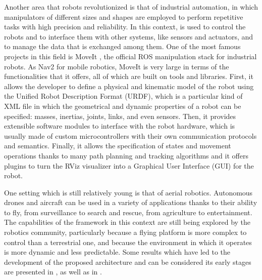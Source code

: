 Another area that robots revolutionized is that of industrial automation, in which manipulators of different sizes and shapes are employed to perform repetitive tasks with high precision and reliability. In this context, \ROS is used to control the robots and to interface them with other systems, like sensors and actuators, and to manage the data that is exchanged among them. One of the most famous projects in this field is MoveIt \cite{picknik_robotics_moveit_nodate,gorner_moveit_2019,coleman_reducing_2014,bonci_robot_2023}, the official ROS manipulation stack for industrial robots. As Nav2 for mobile robotics, MoveIt is very large in terms of the functionalities that it offers, all of which are built on \ROS tools and libraries. First, it allows the developer to define a physical and kinematic model of the robot using the Unified Robot Description Format (URDF), which is a particular kind of XML file in which the geometrical and dynamic properties of a robot can be specified: masses, inertias, joints, links, and even sensors. Then, it provides extensible software modules to interface with the robot hardware, which is usually made of custom microcontrollers with their own communication protocols and semantics. Finally, it allows the specification of states and movement operations thanks to many path planning and tracking algorithms and it offers plugins to turn the RViz visualizer into a Graphical User Interface (GUI) for the robot.

One setting which is still relatively young is that of aerial robotics. Autonomous drones and aircraft can be used in a variety of applications thanks to their ability to fly, from surveillance to search and rescue, from agriculture to entertainment. The capabilities of the \ROS framework in this context are still being explored by the robotics community, particularly because a flying platform is more complex to control than a terrestrial one, and because the environment in which it operates is more dynamic and less predictable. Some results which have led to the development of the proposed architecture and can be considered its early stages are presented in , as well as in \cite{bianchi_novel_2023,bianchi_efficient_2023}.

